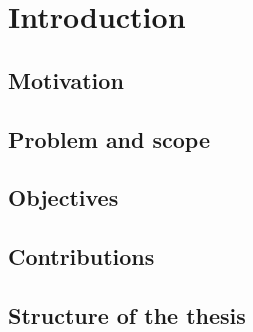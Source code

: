 \chapter{Introduction}
\label{chap:introduction}
\section{Motivation}
\section{Problem and scope}
\section{Objectives}
\section{Contributions}
\section{Structure of the thesis}
